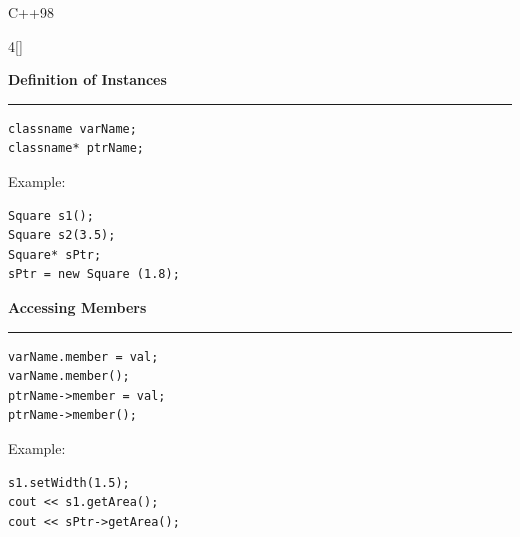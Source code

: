 \documentclass[final]{beamer}
\renewcommand{\subsection}[1]{%
  \par\vspace{1em}%
  {\noindent\large\bfseries #1\par}%
  \vspace{0.5em}\hrule\vspace{1em}%
}
\begin{document}
\begin{frame}[t,fragile]{C++98}
\begin{multicols}{4}[\setlength{\columnsep}{1.5cm}]
 \subsection{Definition of Instances}
\begin{lstlisting}
classname varName;
classname* ptrName;
\end{lstlisting}
Example:
\begin{lstlisting}
Square s1();
Square s2(3.5);
Square* sPtr;
sPtr = new Square (1.8);
\end{lstlisting}

 \subsection{Accessing Members}
\begin{lstlisting}
varName.member = val;
varName.member();
ptrName->member = val;
ptrName->member();
\end{lstlisting}
Example:
\begin{lstlisting}
s1.setWidth(1.5);
cout << s1.getArea();
cout << sPtr->getArea();
\end{lstlisting}
\end{multicols}
\end{frame}
\end{document}
